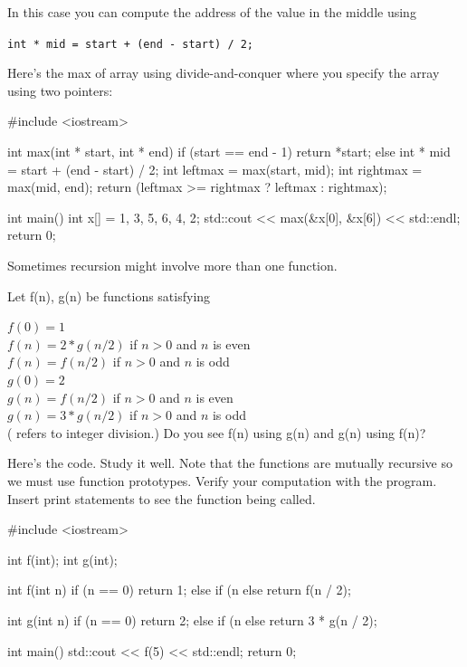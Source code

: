 In this case you can compute the address of the value in the middle
using

\verb!int * mid = start + (end - start) / 2;!

Here's the max of array using divide-and-conquer where you specify the
array using two pointers:

\begin{consolethree}[escapeinside=||]
#include <iostream>

int max(int * start, int * end)
{
    if (start == end - 1)
    {
        return *start;
    }
    else
    {
        int * mid = start + (end - start) / 2;
        int leftmax = max(start, mid);
        int rightmax = max(mid, end);
        return (leftmax >= rightmax ? leftmax : rightmax);
    }
}

int main()
{
    int x[] = {1, 3, 5, 6, 4, 2};
    std::cout << max(&x[0], &x[6]) << std::endl;
    return 0;
}
\end{consolethree}





\newpage{}

Sometimes recursion might involve more than one function.

Let f(n), g(n) be functions satisfying

$f(0) = 1$\\
$f(n) = 2*g(n/2)$ if $n > 0$ and $n$ is even\\
$f(n) = f(n/2)$ if $n > 0$ and $n$ is odd\\

$g(0) = 2$\\
$g(n) = f(n/2)$ if $n > 0$ and $n$ is even\\
$g(n) = 3*g(n/2)$ if $n > 0$ and $n$ is odd\\

(\EMPHASIZE{\/} refers to integer division.) Do you see f(n) using g(n) and g(n)
using f(n)?


Here's the code. Study it well. Note that the functions
are mutually recursive so we must use function prototypes. Verify your
computation with the program. Insert print statements to see the
function being called.

\begin{consolethree}[escapeinside=||]
#include <iostream>

int f(int);
int g(int);

int f(int n)
{
    if (n == 0)
    {
        return 1;
    }
    else
    {
        if (n %
        else return f(n / 2);
    }
}

int g(int n)
{
    if (n == 0)
    {
        return 2;
    }
    else
    {
        if (n %
        else return 3 * g(n / 2);
    }
}

int main()
{
    std::cout << f(5) << std::endl;
    return 0;
}
\end{consolethree}


